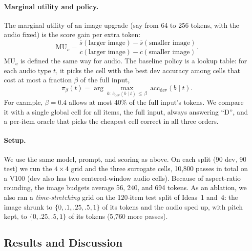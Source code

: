 \documentclass{article}
\begin{document}
\paragraph{Marginal utility and policy.} The marginal utility of an image upgrade
(say from 64 to 256 tokens, with the audio fixed) is the score gain per extra token:
\begin{equation}
\mathrm{MU}_v=\frac{\overline{s}(\text{larger image})-\overline{s}(\text{smaller image})}{\overline{c}(\text{larger image})-\overline{c}(\text{smaller image})}.
\end{equation}
$\mathrm{MU}_a$ is defined the same way for audio. The baseline policy is a lookup
table: for each audio type $t$, it picks the cell with the best dev accuracy among
cells that cost at most a fraction $\beta$ of the full input,
\begin{equation}
\pi_\beta(t)=\arg\max_{b:\ \overline{c}_{\text{dev}}(b\mid t)\,\le\,\beta}\ \overline{\mathrm{acc}}_{\text{dev}}(b\mid t).
\end{equation}
For example, $\beta=0.4$ allows at most 40\% of the full input's tokens. We compare
it with a single global cell for all items, the full input, always answering ``D'',
and a per-item oracle that picks the cheapest cell correct in all three orders.

\paragraph{Setup.} We use the same model, prompt, and scoring as above. On each split
(90 dev, 90 test) we run the $4\times4$ grid and the three surrogate cells, 10,800
passes in total on a V100 (dev also has two centered-window audio cells). Because of
aspect-ratio rounding, the image budgets average 56, 240, and 694 tokens. As an
ablation, we also ran a \emph{time-stretching} grid on the 120-item test split of
Ideas~1 and~4: the image shrunk to $\{0,.1,.25,.5,1\}$ of its tokens and the audio
sped up, with pitch kept, to $\{0,.25,.5,1\}$ of its tokens (5,760 more passes).

\subsection{Results and Discussion}
\end{document}
